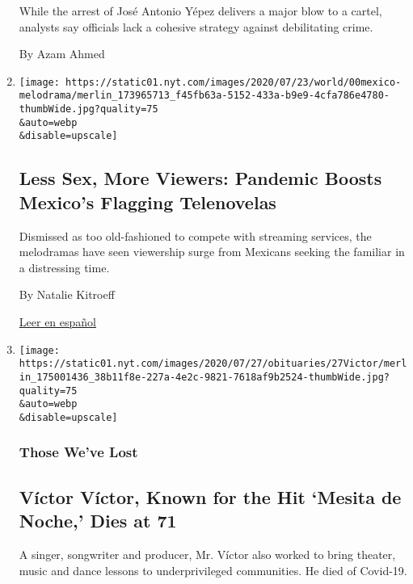 \begin{enumerate}
  While the arrest of José Antonio Yépez delivers a major blow to a
  cartel, analysts say officials lack a cohesive strategy against
  debilitating crime.

  By Azam Ahmed
\item
  \href{/2020/08/02/world/americas/mexico-tv-virus-telenovela.html}{}

  \texttt{[image: https://static01.nyt.com/images/2020/07/23/world/00mexico-melodrama/merlin\_173965713\_f45fb63a-5152-433a-b9e9-4cfa786e4780-thumbWide.jpg?quality=75\\\&auto=webp\\\&disable=upscale]}

  \hypertarget{less-sex-more-viewers-pandemic-boosts-mexicos-flagging-telenovelas}{%
  \subsection{Less Sex, More Viewers: Pandemic Boosts Mexico's Flagging
  Telenovelas}\label{less-sex-more-viewers-pandemic-boosts-mexicos-flagging-telenovelas}}

  Dismissed as too old-fashioned to compete with streaming services, the
  melodramas have seen viewership surge from Mexicans seeking the
  familiar in a distressing time.

  By Natalie Kitroeff

  \href{https://www.nytimes.com/es/2020/08/02/espanol/america-latina/televisa-rosa-de-guadalupe-netflix.html}{Leer
  en español}
\item
  \href{/2020/08/01/obituaries/victor-victor-dead-coronavirus.html}{}

  \texttt{[image: https://static01.nyt.com/images/2020/07/27/obituaries/27Victor/merlin\_175001436\_38b11f8e-227a-4e2c-9821-7618af9b2524-thumbWide.jpg?quality=75\\\&auto=webp\\\&disable=upscale]}

  \hypertarget{those-weve-lost-1}{%
  \subsubsection{Those We've Lost}\label{those-weve-lost-1}}

  \hypertarget{vuxedctor-vuxedctor-known-for-the-hit-mesita-de-noche-dies-at-71}{%
  \subsection{Víctor Víctor, Known for the Hit `Mesita de Noche,' Dies
  at
  71}\label{vuxedctor-vuxedctor-known-for-the-hit-mesita-de-noche-dies-at-71}}

  A singer, songwriter and producer, Mr. Víctor also worked to bring
  theater, music and dance lessons to underprivileged communities. He
  died of Covid-19.


\end{enumerate}

